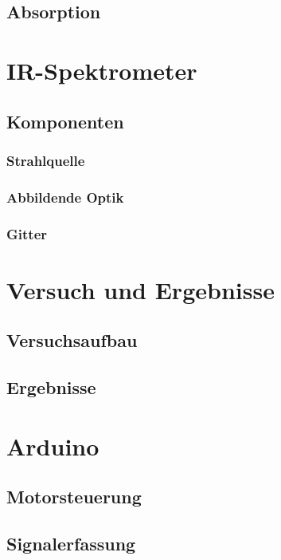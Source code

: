 \documentclass{article}
\begin{document}

\newpage
\subsection{Absorption}


\section{IR-Spektrometer}


\subsection{Komponenten}

\subsubsection{Strahlquelle}


\subsubsection{Abbildende Optik}


\subsubsection{Gitter}


\section{Versuch und Ergebnisse}


\subsection{Versuchsaufbau}


\subsection{Ergebnisse}


\section{Arduino} %

\subsection{Motorsteuerung}

\subsection{Signalerfassung}

\newpage
\printbibliography[heading=bibintoc]
\end{document}
